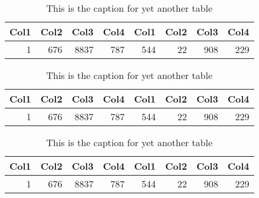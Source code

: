     \begin{table}
        \centering
        \begin{tabular}{r r r r r r r r}
             Col1 & Col2 & Col3 & Col4 & Col1 & Col2 & Col3 & Col4 \\
             \hline
             1    & 676  & 8837 & 787  & 544  & 22   & 908  & 229  \\
             \hline
        \end{tabular}
        \captionsetup{width=3.9in}
        \caption{This is the caption for yet another table}
    \end{table}
    \begin{table}
        \centering
        \begin{tabular}{r r r r r r r r}
             Col1 & Col2 & Col3 & Col4 & Col1 & Col2 & Col3 & Col4 \\
             \hline
             1    & 676  & 8837 & 787  & 544  & 22   & 908  & 229  \\
             \hline
        \end{tabular}
        \captionsetup{width=3.9in}
        \caption{This is the caption for yet another table}
    \end{table}
    \begin{table}
        \centering
        \begin{tabular}{r r r r r r r r}
             Col1 & Col2 & Col3 & Col4 & Col1 & Col2 & Col3 & Col4 \\
             \hline
             1    & 676  & 8837 & 787  & 544  & 22   & 908  & 229  \\
             \hline
        \end{tabular}
        \captionsetup{width=3.9in}
        \caption{This is the caption for yet another table}
    \end{table}
